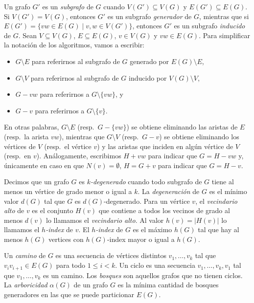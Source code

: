 \documentclass[%
    a4paper,%
    fontsize=12pt,%
    DIV=12,
    twoside,%
    openright,%
    titlepage=true,%
    headsepline,%
    toc=bibliography,%
    parskip=half,%
    cleardoublepage=empty,%
    headings=big,%
]{scrbook}
\begin{document}

Un grafo $G'$ es un \emph{subgrafo} de $G$ cuando $V(G') \subseteq V(G)$ y $E(G') \subseteq E(G)$.  Si $V(G') = V(G)$, entonces $G'$ es un subgrafo \emph{generador} de $G$, mientras que si $E(G') = \{vw \in E(G) \mid v,w \in V(G')\}$, entonces $G'$ es un subgrafo \emph{inducido} de $G$.  Sean $V \subseteq V(G)$, $E \subseteq E(G)$, $v \in V(G)$ y $vw \in E(G)$.  Para simplificar la notación de los algoritmos, vamos a escribir:
\begin{itemize}
  \item $G \setminus E$ para referirnos al subgrafo de $G$ generado por $E(G) \setminus E$, 
  \item $G \setminus V$ para referirnos al subgrafo de $G$ inducido por $V(G) \setminus V$, 
  \item $G - vw$ para referirnos a $G \setminus \{vw\}$, y 
  \item $G - v$ para referirnos a $G \setminus \{v\}$.
\end{itemize}
En otras palabras, $G \setminus E$ (resp.\ $G - \{vw\}$) se obtiene eliminando las aristas de $E$ (resp.\ la arista $vw$), mientras que $G \setminus V$ (resp.\ $G - v$) se obtiene eliminando los vértices de $V$ (resp.\ el vértice $v$) y las aristas que inciden en algún vértice de $V$ (resp.\ en $v$). Análogamente, escribimos $H + vw$ para indicar que $G = H - vw$ y, únicamente en caso en que $N(v) = \emptyset$, $H = G + v$ para indicar que $G = H - v$.  

Decimos que un grafo $G$ es \emph{$k$-degenerado} cuando todo subgrafo de $G$ tiene al menos un vértice de grado menor o igual a $k$.  La \emph{degeneración} de $G$ es el mínimo valor $d(G)$ tal que $G$ es $d(G)$-degenerado.  Para un vértice $v$, el \emph{vecindario alto} de $v$ es el conjunto $H(v)$ que contiene a todos los vecinos de grado al menos $d(v)$ lo llamamos el \emph{vecindario alto}.  Al valor $h(v) = |H(v)|$ lo llamamos el \emph{$h$-index} de $v$.  El \emph{$h$-index} de $G$ es el máximo $h(G)$ tal que hay al menos $h(G)$ vertices con $h(G)$-index mayor o igual a $h(G)$.

Un \emph{camino} de $G$ es una secuencia de vértices distintos $v_1, \ldots, v_k$ tal que $v_iv_{i+1} \in E(G)$ para todo $1 \leq i < k$.  Un ciclo es una secuencia $v_1, \ldots, v_k, v_1$ tal que $v_1, \ldots, v_k$ es un camino.  Los \emph{bosques} son aquellos grafos que no tienen ciclos.  La \emph{arboricidad} $\alpha(G)$ de un grafo $G$ es la mínima cantidad de bosques generadores en las que se puede particionar $E(G)$.  
\end{document}

